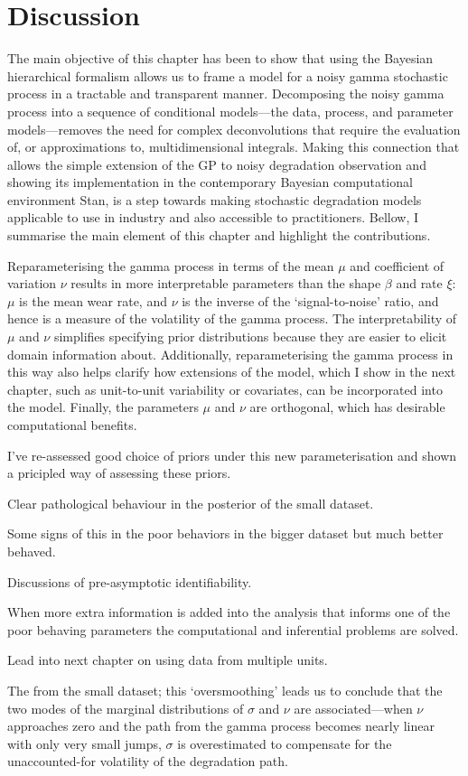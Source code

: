 \section{Discussion}

The main objective of this chapter has been to show that using the Bayesian hierarchical formalism allows us to frame a model for a noisy gamma stochastic process in a tractable and transparent manner. Decomposing the noisy gamma process into a sequence of conditional models---the data, process, and parameter models---removes the need for complex deconvolutions that require the evaluation of, or approximations to, multidimensional integrals. Making this connection that allows the simple extension of the GP to noisy degradation observation and showing its implementation in the contemporary Bayesian computational environment Stan, is a step towards making stochastic degradation models applicable to use in industry and also accessible to practitioners. Bellow, I summarise the main element of this chapter and highlight the contributions.

Reparameterising the gamma process in terms of the mean $\mu$ and coefficient of variation $\nu$ results in more interpretable parameters than the shape $\beta$ and rate $\xi$: $\mu$ is the mean wear rate, and $\nu$ is the inverse of the `signal-to-noise' ratio, and hence is a measure of the volatility of the gamma process.
The interpretability of $\mu$ and $\nu$ simplifies specifying prior distributions because they are easier to elicit domain information about. Additionally, reparameterising the gamma process in this way also helps clarify how extensions of the model, which I show in the next chapter, such as unit-to-unit variability or covariates, can be incorporated into the model. Finally, the parameters $\mu$ and $\nu$ are orthogonal, which has desirable computational benefits.

I've re-assessed good choice of priors under this new parameterisation and shown a pricipled way of assessing these priors.

Clear pathological behaviour in the posterior of the small dataset.

Some signs of this in the poor behaviors in the bigger dataset but much better behaved.

Discussions of pre-asymptotic identifiability.

When more extra information is added into the analysis that informs one of the poor behaving parameters the computational and inferential problems are solved.

Lead into next chapter on using data from multiple units.



The from the small dataset; this `oversmoothing' leads us to conclude that the two modes of the marginal distributions of $\sigma$ and $\nu$ are associated---when $\nu$ approaches zero and the path from the gamma process becomes nearly linear with only very small jumps, $\sigma$ is overestimated to compensate for the unaccounted-for volatility of the degradation path.